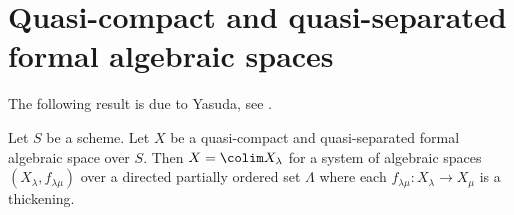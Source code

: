 \section{Quasi-compact and quasi-separated formal algebraic spaces}
\label{section-quasi-compact-quasi-separated}

\noindent
The following result is due to Yasuda, see
\cite[Proposition 3.32]{Yasuda}.

\begin{lemma}
\label{lemma-structure-quasi-compact-quasi-separated}
\begin{reference}
\cite[Proposition 3.32]{Yasuda}
\end{reference}
Let $S$ be a scheme. Let $X$ be a quasi-compact and quasi-separated
formal algebraic space over $S$. Then $X = \colim X_\lambda$
for a system of algebraic spaces $(X_\lambda, f_{\lambda \mu})$
over a directed partially ordered set $\Lambda$ where each
$f_{\lambda \mu} : X_\lambda \to X_\mu$ is a thickening.
\end{lemma}

